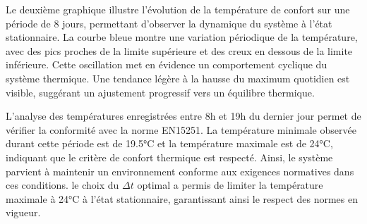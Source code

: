 \documentclass[12pt]{article}
\begin{document}
Le deuxième graphique illustre l'évolution de la température de confort sur une période de 8 jours, permettant d'observer la dynamique du système à l'état stationnaire. La courbe bleue montre une variation périodique de la température, avec des pics proches de la limite supérieure et des creux en dessous de la limite inférieure. Cette oscillation met en évidence un comportement cyclique du système thermique. Une tendance légère à la hausse du maximum quotidien est visible, suggérant un ajustement progressif vers un équilibre thermique.

L'analyse des températures enregistrées entre 8h et 19h du dernier jour permet de vérifier la conformité avec la norme EN15251. La température minimale observée durant cette période est de 19.5°C et la température maximale est de 24°C, indiquant que le critère de confort thermique est respecté. Ainsi, le système parvient à maintenir un environnement conforme aux exigences normatives dans ces conditions. le choix du $\Delta t$ optimal a permis de limiter la température maximale à 24°C à l’état stationnaire, garantissant ainsi le respect des normes en vigueur.


        



\newpage

\end{document}
